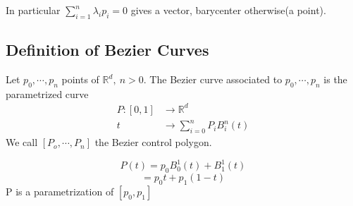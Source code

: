 In particular $ \sum_{i=1}^{n} \lambda_ip_i = 0 $ gives a vector, barycenter otherwise(a
point). 


\subsection{Definition of Bezier Curves}
\label{subsec:Definition of Bezier Curves}
Let $ p_0, \cdots, p_n $ points of $ \mathbb{R}^d,\ n > 0 $. The Bezier curve associated
to $ p_0, \cdots, p_n $ is the parametrized curve
\begin{align*}
    P:[0,1] &\rightarrow \mathbb{R}^d  \\ 
    t &\rightarrow \sum_{i=0}^{n} P_iB_i^n(t)
\end{align*}
We call $ [P_o, \cdots, P_n] $ the Bezier control polygon. 

\begin{exmp}[n=1]
    \[
        P(t) = p_0B _{0 }^{ 1 }(t) + B _{ 1 }^{ 1 } (t) 
    \]
    \[
    = p_0t + p_1\left( 1-t\right) 
    \]
    P is a parametrization of $ [p_0, p_1] $
\end{exmp}


